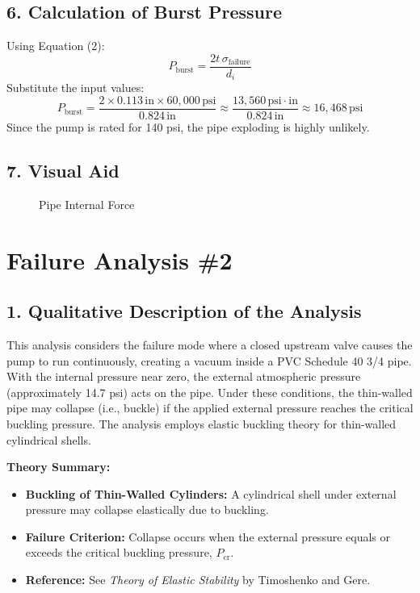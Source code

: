 \documentclass[12pt]{article}
\begin{document}
\subsection*{6. Calculation of Burst Pressure}
Using Equation (2):
\[
P_{\text{burst}} = \frac{2t\, \sigma_{\text{failure}}}{d_i}
\]
Substitute the input values:
\[
P_{\text{burst}} = \frac{2 \times 0.113\,\text{in} \times 60,000\,\text{psi}}{0.824\,\text{in}} \approx \frac{13,560\,\text{psi}\cdot\text{in}}{0.824\,\text{in}} \approx 16,468\,\text{psi}
\]
Since the pump is rated for 140 psi, the pipe exploding is highly unlikely.

\subsection*{7. Visual Aid}
\begin{figure}[!ht]
\centering
{}%
\label{fig:expo_pipe}
\caption{Pipe Internal Force}
\end{figure}
\newpage

\section*{Failure Analysis \#2}

\subsection*{1. Qualitative Description of the Analysis}
This analysis considers the failure mode where a closed upstream valve causes the pump to run continuously, creating a vacuum inside a PVC Schedule 40 3/4 pipe. With the internal pressure near zero, the external atmospheric pressure (approximately 14.7 psi) acts on the pipe. Under these conditions, the thin-walled pipe may collapse (i.e., buckle) if the applied external pressure reaches the critical buckling pressure. The analysis employs elastic buckling theory for thin-walled cylindrical shells.

\noindent\textbf{Theory Summary:}
\begin{itemize}
    \item \textbf{Buckling of Thin-Walled Cylinders:} A cylindrical shell under external pressure may collapse elastically due to buckling.
    \item \textbf{Failure Criterion:} Collapse occurs when the external pressure equals or exceeds the critical buckling pressure, \(P_{\text{cr}}\).
    \item \textbf{Reference:} See \emph{Theory of Elastic Stability} by Timoshenko and Gere.
\end{itemize}
\end{document}
